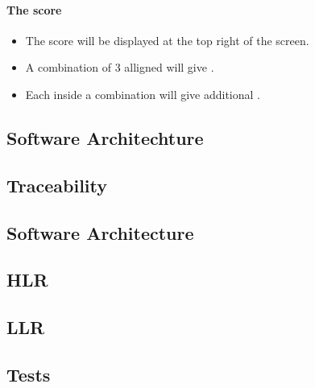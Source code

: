 \paragraph{The score}

\begin{itemize}
\item The score will be displayed at the top right of the screen.
\item A combination of 3 alligned \sqs will give \threepts \pts.
\item Each \sq inside a combination will give \sqpts additional \pts.
\end{itemize}

\subsection{Software Architechture}



\subsection{Traceability}



\subsection{Software Architecture}

\subsection{HLR}

\subsection{LLR}

\subsection{Tests}

\newpage

